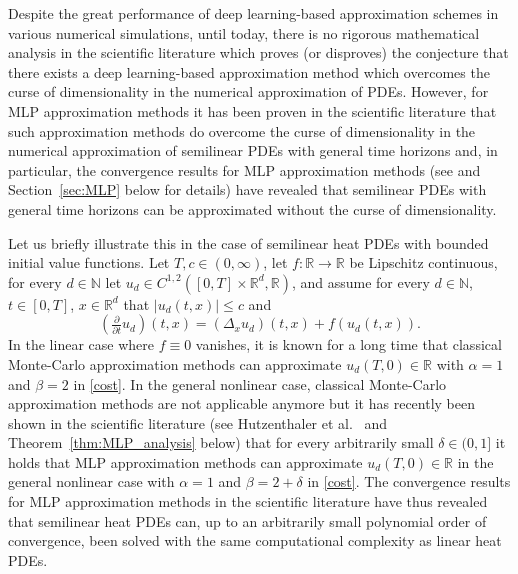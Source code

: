 \documentclass[12pt,AutoFakeBold,AutoFakeSlant]{article}
\theoremstyle{definition}
\newcommand{\R}{\mathbb{R}}
\newcommand{\N}{\mathbb{N}}
\begin{document}
	Despite the great performance of deep learning-based approximation
	schemes in various numerical simulations, until today, 
	there is no rigorous mathematical analysis in the scientific literature 
	which proves (or disproves) 
	the conjecture that there exists a deep learning-based approximation method 
	which overcomes the curse of dimensionality 
	in the numerical approximation of PDEs. 
	However, for MLP approximation methods 
	it has been proven in the scientific literature 
	that such approximation methods do 
	overcome the curse of dimensionality in the numerical approximation
	of semilinear PDEs with general time horizons 
	and, in particular, the convergence results for MLP approximation methods 
	(see 
	\cite{becker2020arxiv2005,E2016multilevel,Hutzenthaleretal2018arXiv,
	hutzenthaler2019arxiv1903,
	Becketal2019MLP_nonlip_arXiv,giles2019generalised,
	beck2020arxiv2003,
	hutzenthaler2019arxiv1912,hutzenthaler2020multilevel,
	hutzenthaler2020lipschitz} and Section~\ref{sec:MLP} below for details) 
	have revealed that semilinear PDEs with general time horizons 
	can be approximated without the curse of dimensionality. 



	Let us briefly illustrate this in the case of semilinear heat PDEs 
	with bounded initial value functions. 
	Let $ T, c \in (0,\infty) $, 
	let $ f \colon \R \to \R $ be Lipschitz continuous, 
	for every $ d \in \N $ let 
	$ u_d \in C^{ 1, 2 }( [0,T] \times \R^d, \R ) $, 
	and assume for every 
	$ d \in \N $, $ t \in [0,T] $,
	$ x \in \R^d $
	that 
	$
	| u_d(t,x) | \leq c
	$
	and 
	\begin{equation}
	\label{eq:MLP_allen_cahn_pde_intro}
	(\tfrac{\partial}{\partial t}u_d)(t,x) 
	= 
	(\Delta_x u_d)(t,x) 
	+ 
	f(u_d(t,x)) .
	\end{equation} 
	In the linear case where $ f \equiv 0 $ vanishes, 
	it is known for a long time that 
	classical Monte-Carlo approximation methods 
	can approximate $ u_d( T, 0 ) \in \R $ 
	with $ \alpha = 1 $ and $ \beta = 2 $ 
	in \eqref{cost}. 
	In the general nonlinear case, 
	classical Monte-Carlo approximation methods 
	are not applicable anymore 
	but 
	it has recently been shown in the scientific literature 
	(see 
	Hutzenthaler et al.~\cite{Hutzenthaleretal2018arXiv} 
	and Theorem~\ref{thm:MLP_analysis} below) 
	that 
	for every arbitrarily small $ \delta \in (0,1] $ 
	it holds that 
	MLP approximation methods 
	can approximate $ u_d( T, 0 ) \in \R $ 
	in the general nonlinear case 
	with $ \alpha = 1 $ and $ \beta = 2 + \delta $ 
	in \eqref{cost}. 
	The convergence results for MLP approximation methods 
	in the scientific literature have thus revealed that 
	semilinear heat PDEs can, up to an arbitrarily small 
	polynomial order of convergence, been solved 
	with the same computational complexity 
	as linear heat PDEs. 
\end{document}
